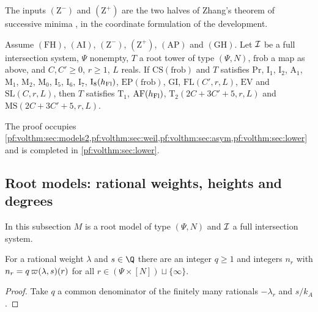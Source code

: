 The inputs $(\mathrm{Z}^-)$ and $(\mathrm{Z}^+)$ are the two halves of Zhang's theorem of successive minima
\cite[Thm.~5.2]{Zhang1995}, in the coordinate formulation of the development.

\begin{theorem}\label{pf:volthm:thm:tower}
Assume $(\mathrm{FH})$, $(\mathrm{AI})$, $(\mathrm{Z}^-)$,
$(\mathrm{Z}^+)$, $(\mathrm{AP})$ and $(\mathrm{GH})$. Let
$\mathcal{I}$ be a full intersection system, $\Psi$ nonempty, $T$ a root tower of type $(\Psi,N)$,
$\mathrm{frob}$ a map as above, and $C,C'\ge0$, $r\ge1$, $L$ reals. If $\mathrm{CS}(\mathrm{frob})$ and
$T$ satisfies $\mathrm{Pr}$, $\mathrm{I}_1$, $\mathrm{I}_2$, $\mathrm{A}_1$, $\mathrm{M}_1$,
$\mathrm{M}_2$, $\mathrm{M}_0$, $\mathrm{I}_5$, $\mathrm{I}_6$, $\mathrm{I}_7$, $\mathrm{I}_8(h_{\mathrm{Fl}})$,
$\mathrm{EP}(\mathrm{frob})$, $\mathrm{GI}$, $\mathrm{FL}(C',r,L)$, $\mathrm{EV}$ and
$\mathrm{SL}(C,r,L)$, then $T$ satisfies $\mathrm{T}_1$, $\mathrm{AF}(h_{\mathrm{Fl}})$,
$\mathrm{T}_2(2C+3C'+5,r,L)$ and $\mathrm{MS}(2C+3C'+5,r,L)$.
\end{theorem}

The proof occupies \cref{pf:volthm:sec:models2,pf:volthm:sec:weil,pf:volthm:sec:asym,pf:volthm:sec:lower}
and is completed in \cref{pf:volthm:sec:lower}.

\subsection{Root models: rational weights, heights and degrees}\label{pf:volthm:sec:models2}

In this subsection $M$ is a root model of type $(\Psi,N)$ and $\mathcal{I}$ a full intersection system.

\begin{lemma}\label{pf:volthm:lem:intcoef}
For a rational weight $\lambda$ and $s\in\Q$ there are an integer $q\ge1$ and integers $n_r$ with
$n_r=q\,\varpi(\lambda,s)(r)$ for all $r\in(\Psi\times[N])\sqcup\{\infty\}$.
\end{lemma}

\begin{proof}
Take $q$ a common denominator of the finitely many rationals $-\lambda_r$ and $s/k_A$.
\end{proof}


